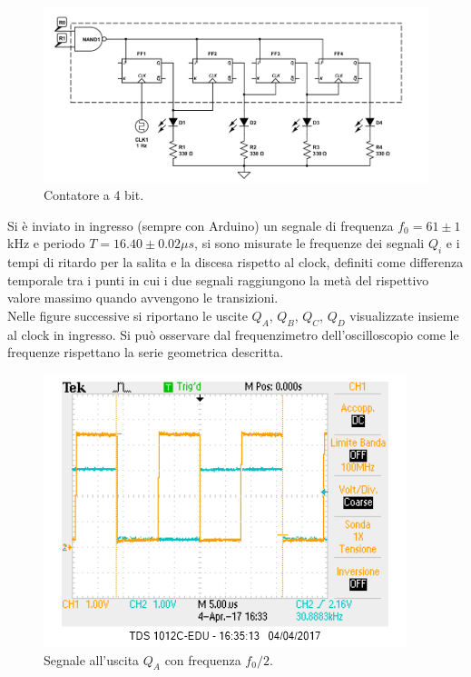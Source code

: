 \documentclass[10pt,a4paper]{article}
\begin{document}
\begin{figure}
\centering
\includegraphics[scale=0.5]{divisore.png}
\caption{Contatore a 4 bit.\label{contatore}}
\end{figure}

Si è inviato in ingresso (sempre con Arduino) un segnale di frequenza $f_0 = 61 \pm 1$kHz e periodo $T = 16.40 \pm 0.02 \mu s$, si sono misurate le frequenze dei segnali $Q_i$ e i tempi di ritardo per la salita e la discesa rispetto al clock, definiti come differenza temporale tra i punti in cui i due segnali raggiungono la metà del rispettivo valore massimo quando avvengono le transizioni.\\

Nelle figure successive si riportano le uscite $Q_A$, $Q_B$, $Q_C$, $Q_D$ visualizzate insieme al clock in ingresso. Si può osservare dal frequenzimetro dell'oscilloscopio come le frequenze rispettano la serie geometrica descritta.\\

\begin{figure}
\centering
\includegraphics[scale=1.0]{QA1-2.png}
\caption{Segnale all'uscita $Q_A$ con frequenza $f_0/2$.\label{freq2}}
\end{figure}
\end{document}
